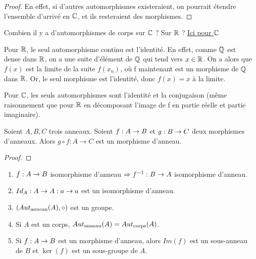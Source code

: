 \ifdefined\outputproof
\begin{proof}
	En effet, si d'autres automorphismes existeraient, on pourrait étendre
	l'ensemble d'arrivé en $\mathbb{C}$, et ils resteraient des morphismes.
\end{proof}
\fi

\begin{question}
	Combien il y a d'automorphismes de corps sur $\mathbb{C}$ ? Sur $\mathbb{R}$ ?
	\href{http://www.math.uga.edu/~pete/Kestelman51.pdf}{Ici pour $\mathbb{C}$}

	Pour $\mathbb{R}$, le seul automorphisme continu est l'identité. En effet, comme
	$\mathbb{Q}$ est dense dans $\mathbb{R}$, on a une suite d'élément de $\mathbb{Q}$
	qui tend vers $x \in \mathbb{R}$. On a alors que $f(x)$ est la limite de la suite
	$f(x_{n})$, où f maintenant est un morphisme de $\mathbb{Q}$ dans $\mathbb{R}$.
	Or, le seul morphisme est l'identité, donc $f(x) = x$ à la limite.

	Pour $\mathbb{C}$, les seuls automorphismes sont l'identité et la conjugaison
	(même raisonnement que pour $\mathbb{R}$ en décomposant l'image de f en partie
	réelle et partie imaginaire).
\end{question}

\begin{proposition}
	Soient $A, B, C$ trois anneaux.
	Soient $f : A \rightarrow B$ et $g : B \rightarrow C$ deux morphismes
	d'anneaux. Alors $g \circ f : A \rightarrow C$ est un morphisme d'anneau.
\end{proposition}

\ifdefined\outputproof
\begin{proof}

\end{proof}
\fi

\begin{proposition}
	\begin{enumerate}
		\item $f : A \rightarrow B$ isomorphisme d'anneau $\Rightarrow
			f^{-1} : B \rightarrow A$ isomorphisme d'anneau.
		\item $Id_{A} : A \rightarrow A : a \rightarrow a$ est un isomorphisme
			d'anneau.
		\item $(Aut_{\text{anneau}}(A), \circ)$ est un groupe.
		\item Si $A$ est un corps, $Aut_{\text{anneau}}(A) =
			Aut_{\text{corps}}(A)$.
		\item Si $f : A \rightarrow B$ est un morphisme d'anneau, alors
			$Im(f)$ est un sous-anneau de $B$ et $\ker(f)$ est un sous-groupe de
			$A$.
	\end{enumerate}
\end{proposition}

